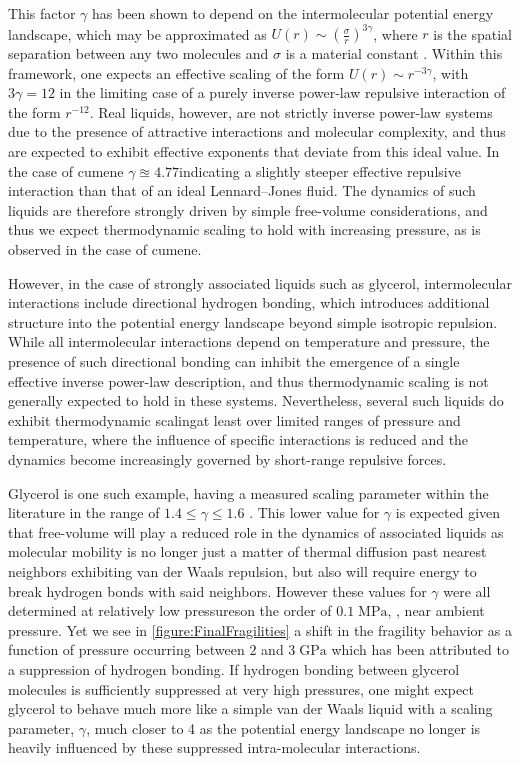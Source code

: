 This factor $\gamma$ has been shown to depend on the intermolecular potential energy landscape, which may be approximated as $U(r)\sim\left(\frac{\sigma}{r}\right)^{3\gamma}$, where $r$ is the spatial separation between any two molecules and $\sigma$ is a material constant \nolinebreak\cite{Roland2005RPP, Roland3,Coslovich}. Within this framework, one expects an effective scaling of the form $U(r)\sim r^{-3\gamma}$, with $3\gamma = 12$ in the limiting case of a purely inverse power-law repulsive interaction of the form $r^{-12}$. Real liquids, however, are not strictly inverse power-law systems due to the presence of attractive interactions and molecular complexity, and thus are expected to exhibit effective exponents that deviate from this ideal value. In the case of cumene $\gamma\approxeq4.77$\textemdash indicating a slightly steeper effective repulsive interaction than that of an ideal Lennard--Jones fluid. The dynamics of such liquids are therefore strongly driven by simple free-volume considerations, and thus we expect thermodynamic scaling to hold with increasing pressure, as is observed in the case of cumene.

However, in the case of strongly associated liquids such as glycerol, intermolecular interactions include directional hydrogen bonding, which introduces additional structure into the potential energy landscape beyond simple isotropic repulsion. While all intermolecular interactions depend on temperature and pressure, the presence of such directional bonding can inhibit the emergence of a single effective inverse power-law description, and thus thermodynamic scaling is not generally expected to hold in these systems. Nevertheless, several such liquids do exhibit thermodynamic scaling\textemdash at least over limited ranges of pressure and temperature, where the influence of specific interactions is reduced and the dynamics become increasingly governed by short-range repulsive forces.

Glycerol is one such example, having a measured scaling parameter within the literature in the range of $1.4\leq \gamma \leq 1.6$ \nolinebreak\cite{Reiser,Kyaw}.  This lower value for $\gamma$ is expected given that free-volume will play a reduced role in the dynamics of associated liquids as molecular mobility is no longer just a matter of thermal diffusion past nearest neighbors exhibiting van der Waals repulsion, but also will require energy to break hydrogen bonds with said neighbors.  However these values for $\gamma$ were all determined at relatively low pressures\textemdash on the order of $0.1\;\si{\mega\pascal}$, \ie, near ambient pressure.  Yet we see in \fig \ref{figure:FinalFragilities} a shift in the fragility behavior as a function of pressure occurring between $2$ and $3\;\si{\giga\pascal}$ which has been attributed to a suppression of hydrogen bonding. If hydrogen bonding between glycerol molecules is sufficiently suppressed at very high pressures, one might expect glycerol to behave much more like a simple van der Waals liquid with a scaling parameter, $\gamma$, much closer to 4 as the potential energy landscape no longer is heavily influenced by these suppressed intra-molecular interactions.  

